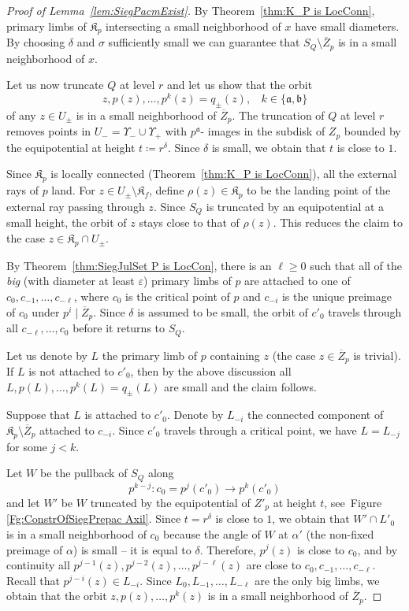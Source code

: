 \documentclass[]{amsart}
\renewcommand{\sp}{{\ \ }}
\newcommand\Kfilled{{\mathfrak K}}
\renewcommand{\aa}{{\mathfrak{a}}}
\newcommand{\bb}{{\mathfrak{b}}}
\theoremstyle{remark}
\numberwithin{equation}{section}
\theoremstyle{definition}
\begin{document}
\begin{proof}[Proof of Lemma~\ref{lem:SiegPacmExist}]
By Theorem~\ref{thm:K_P is LocConn}, primary limbs of $\Kfilled_p$ intersecting a small neighborhood of $x$ have small diameters. By choosing $\delta$ and $\sigma$ sufficiently small we can guarantee that $S_Q\setminus \overline Z_p$ is in a small neighborhood of $x$.

Let us now truncate $Q$ at level $r$ and let us show that the orbit \[z, p(z), \dots ,  p^k(z)=q_{\pm}(z),\sp\sp k\in \{\aa,\bb\} \] of any $z\in U_{\pm}$ is in a small neighborhood of $\overline Z_p$. The truncation of $Q$ at level $r$ removes points in $U_-=\Upsilon_-\cup \Upsilon_+$ with $p^\aa$- images in the subdisk of $Z_p$ bounded by the equipotential at height $t\coloneqq r^\delta$. Since $\delta$ is small, we obtain that $t$ is close to $1$.


Since $\Kfilled_p$ is locally connected (Theorem~\ref{thm:K_P is LocConn}), all the external rays of $p$ land. For $z\in U_{\pm} \setminus \Kfilled_f$, define $\rho(z)\in \Kfilled_p$ to be the landing point of the external ray passing through $z$. Since $S_Q$ is truncated by an equipotential at a small height, the orbit of $z$ stays close to that of $\rho(z)$. This reduces the claim to the case  $z\in \Kfilled_p\cap U_{\pm}$. 

By Theorem~\ref{thm:SiegJulSet P is LocCon}, there is an $\ell\ge 0$ such that all of the \emph{big} (with diameter at least $\varepsilon$) primary limbs of $p$ are attached to one of $c_0, c_{-1},\dots, c_{-\ell}$, where $c_0$ is the critical point of $p$ and $c_{-i}$ is the unique preimage of $c_0$ under $p^i\mid \overline Z_p$. Since $\delta $ is assumed to be small, the orbit of $c'_0$ travels through all $c_{-\ell}, \dots, c_{0}$ before it returns to $S_Q$.


 Let us denote by $L$ the primary limb of $p$ containing $z$ (the case $z\in \overline Z_p$ is trivial). If $L$ is not attached to $c'_0$, then by the above discussion all $L, p(L), \dots , p^k(L)=q_{\pm}(L)$ are small and the claim follows. 
 
 
 Suppose that $L$ is attached to $c'_0$. Denote by $L_{-i}$ the connected component of $\Kfilled_p\setminus \overline Z_p$ attached to $c_{-i}$. Since $c'_0$ travels through a critical point, we have $L=L_{-j}$ for some $j< k$. 
 
 Let $W$ be the pullback of $S_Q$ along \[p^{k-j}\colon c_0=p^j(c'_{0})\to p^k(c'_0)\]
and let $W'$ be $W$ truncated by the equipotential of $Z'_p$ at height $t$, see~Figure \ref{Fg:ConstrOfSiegPrepac Axil}. Since $t= r^\delta$ is close to $1$, we obtain that $W'\cap L'_0$ is in a small neighborhood of $c_0$ because the angle of $W$ at $\alpha'$ (the non-fixed preimage of $\alpha$) is small -- it is equal to $\delta$. Therefore, $p^j(z)$ is close to $c_0$, and by continuity all $p^{j-1}(z),p^{j-2}(z),\dots , p^{j-\ell}(z)$ are close to $c_0, c_{-1},\dots , c_{-\ell}$. Recall that $p^{j-i}(z)\in L_{-i}$. Since $L_0,L_{-1}, \dots , L_{-\ell}$ are the only big limbs, we obtain that the orbit $z,p(z), \dots, p^k(z)$ is in a small neighborhood of $\overline Z_p$. 




\end{proof}
\end{document}
